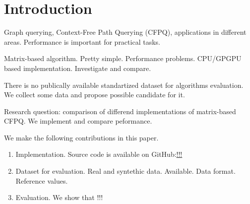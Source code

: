 \section{Introduction}

Graph querying, Context-Free Path Querying (CFPQ), applications in different areas.
Performance is important for practical tasks.

Matrix-based algorithm.
Pretty simple.
Performance problems.
CPU/GPGPU based implementation.
Investigate and compare.

There is no publically available standartized dataset for algorithms evaluation.
We collect some data and propose possible candidate for it. 

Research question: comparison of differend implementations of matrix-based CFPQ.
We implement and compare peformance.

We make the following contributions in this paper.

\begin{enumerate}
\item Implementation. Source code is available on GitHub:\url{!!!}
\item Dataset for evaluation. Real and syntethic data. Available. Data format. Reference values.
\item Evaluation. We show that !!!
\end{enumerate}
